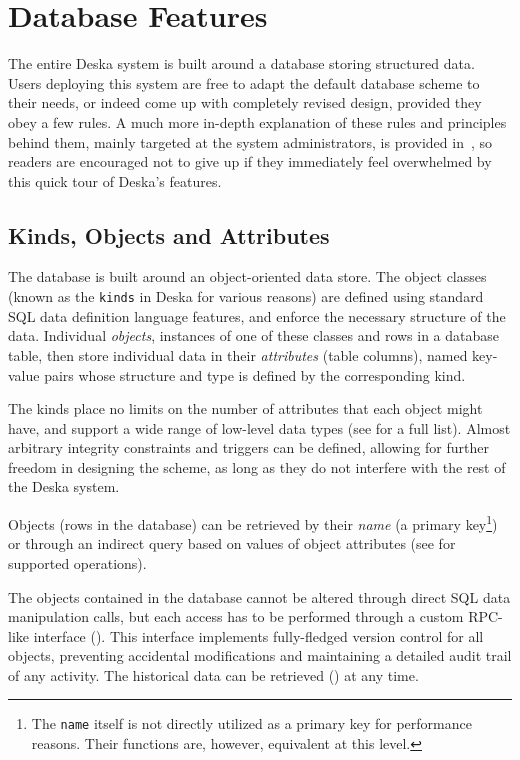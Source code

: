 \documentclass[deska]{subfiles}
\begin{document}
\section{Database Features}

The entire Deska system is built around a database storing structured data.  Users deploying this system are free to
adapt the default database scheme to their needs, or indeed come up with completely revised design, provided they obey a
few rules.  A much more in-depth explanation of these rules and principles behind them, mainly targeted at the system
administrators, is provided in~, so readers are encouraged not to give up if they
immediately feel overwhelmed by this quick tour of Deska's features.

\subsection{Kinds, Objects and Attributes}

The database is built around an object-oriented data store.  The object classes (known as the {\tt kinds} in Deska for
various reasons) are defined using standard SQL data definition language features, and enforce the necessary structure
of the data.  Individual {\em objects}, instances of one of these classes and rows in a database table, then store
individual data in their {\em attributes} (table columns), named key-value pairs whose structure and type is defined by
the corresponding kind.

The kinds place no limits on the number of attributes that each object might have, and support a wide range of low-level
data types (see  for a full list).  Almost arbitrary integrity constraints and
triggers can be defined, allowing for further freedom in designing the scheme, as long as they do not interfere with the
rest of the Deska system.

Objects (rows in the database) can be retrieved by their {\em name} (a primary key\footnote{The {\tt name} itself is not
directly utilized as a primary key for performance reasons.  Their functions are, however, equivalent at this level.})
or through an indirect query based on values of object attributes (see  for supported
operations).

The objects contained in the database cannot be altered through direct SQL data manipulation calls, but each access has
to be performed through a custom RPC-like interface ().  This interface
implements fully-fledged version control for all objects, preventing accidental modifications and maintaining a detailed
audit trail of any activity.  The historical data can be retrieved () at any time.
\end{document}
